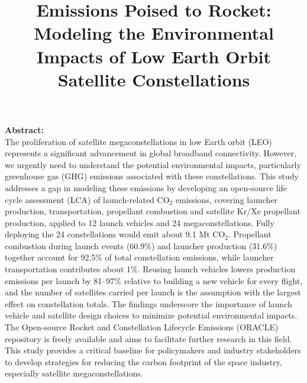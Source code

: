 \documentclass[pdflatex,sn-mathphys-num]{sn-jnl}
\theoremstyle{thmstyleone}%
\theoremstyle{thmstyletwo}%
\theoremstyle{thmstylethree}%
\begin{document}
\onehalfspacing
\linenumbers

\title[Article Title]{Emissions Poised to Rocket: Modeling the Environmental Impacts of Low Earth Orbit Satellite Constellations}

\author[1]{ }
\author[2]{ }
\author[3]{ }


\maketitle

\vspace{-4em}
\noindent\textbf{Abstract:}\\
The proliferation of satellite megaconstellations in low Earth orbit (LEO) represents a significant advancement in global broadband connectivity. However, we urgently need to understand the potential environmental impacts, particularly greenhouse gas (GHG) emissions associated with these constellations. This study addresses a gap in modeling these emissions by developing an open-source life cycle assessment (LCA) of launch-related CO$_2$ emissions, covering launcher production, transportation, propellant combustion and satellite Kr/Xe propellant production, applied to 12 launch vehicles and 24 megaconstellations. Fully deploying the 24 constellations would emit about 9.1 Mt CO$_2$. Propellant combustion during launch events (60.9\%) and launcher production (31.6\%) together account for 92.5\% of total constellation emissions, while launcher transportation contributes about 1\%. Reusing launch vehicles lowers production emissions per launch by 81--97\% relative to building a new vehicle for every flight, and the number of satellites carried per launch is the assumption with the largest effect on constellation totals. The findings underscore the importance of launch vehicle and satellite design choices to minimize potential environmental impacts. The Open-source Rocket and Constellation Lifecycle Emissions (ORACLE) repository is freely available and aims to facilitate further research in this field. This study provides a critical baseline for policymakers and industry stakeholders to develop strategies for reducing the carbon footprint of the space industry, especially satellite megaconstellations.
\end{document}
